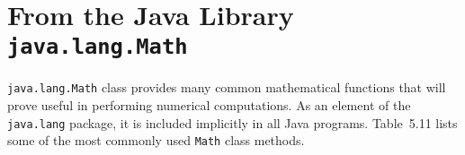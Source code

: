 




\section{{\bf From the Java Library} {\tt java.lang.Math}}
\label{}

 {\tt java.lang.Math} class provides many common
\WWWjava 
mathematical functions that will prove useful in performing numerical
computations.  As an element of the {\tt java.lang} package, it is
included implicitly in all Java programs. Table~5.11 lists some of the
most commonly used {\tt Math} class \mbox{methods.}

